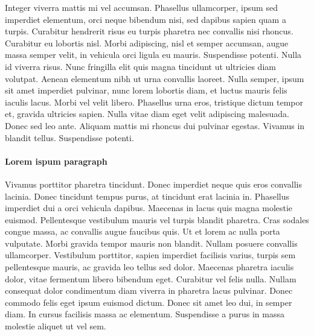 \documentclass[a4paper,parskip=half,oneside]{scrbook}
\begin{document}
Integer viverra mattis mi vel accumsan. Phasellus ullamcorper, ipsum sed imperdiet elementum, orci neque bibendum nisi, sed dapibus sapien quam a turpis. Curabitur hendrerit risus eu turpis pharetra nec convallis nisi rhoncus. Curabitur eu lobortis nisl. Morbi adipiscing, nisl et semper accumsan, augue massa semper velit, in vehicula orci ligula eu mauris. Suspendisse potenti. Nulla id viverra risus. Nunc fringilla elit quis magna tincidunt ut ultricies diam volutpat. Aenean elementum nibh ut urna convallis laoreet. Nulla semper, ipsum sit amet imperdiet pulvinar, nunc lorem lobortis diam, et luctus mauris felis iaculis lacus. Morbi vel velit libero. Phasellus urna eros, tristique dictum tempor et, gravida ultricies sapien. Nulla vitae diam eget velit adipiscing malesuada. Donec sed leo ante. Aliquam mattis mi rhoncus dui pulvinar egestas. Vivamus in blandit tellus. Suspendisse potenti.


\paragraph{Lorem ispum paragraph}
Vivamus porttitor pharetra tincidunt. Donec imperdiet neque quis eros convallis lacinia. Donec tincidunt tempus purus, at tincidunt erat lacinia in. Phasellus imperdiet dui a orci vehicula dapibus. Maecenas in lacus quis magna molestie euismod. Pellentesque vestibulum mauris vel turpis blandit pharetra. Cras sodales congue massa, ac convallis augue faucibus quis. Ut et lorem ac nulla porta vulputate. Morbi gravida tempor mauris non blandit. Nullam posuere convallis ullamcorper. Vestibulum porttitor, sapien imperdiet facilisis varius, turpis sem pellentesque mauris, ac gravida leo tellus sed dolor. Maecenas pharetra iaculis dolor, vitae fermentum libero bibendum eget. Curabitur vel felis nulla. Nullam consequat dolor condimentum diam viverra in pharetra lacus pulvinar. Donec commodo felis eget ipsum euismod dictum. Donec sit amet leo dui, in semper diam. In cursus facilisis massa ac elementum. Suspendisse a purus in massa molestie aliquet ut vel sem. 
\end{document}
